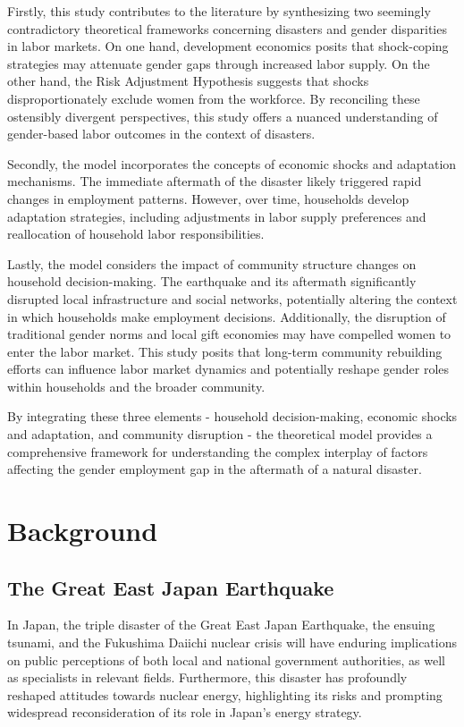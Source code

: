 \documentclass[12pt,halfline,a4paper]{ouparticle}
\begin{document}
Firstly, this study contributes to the literature by synthesizing two seemingly contradictory theoretical frameworks concerning disasters and gender disparities in labor markets. On one hand, development economics posits that shock-coping strategies may attenuate gender gaps through increased labor supply. On the other hand, the Risk Adjustment Hypothesis suggests that shocks disproportionately exclude women from the workforce. By reconciling these ostensibly divergent perspectives, this study offers a nuanced understanding of gender-based labor outcomes in the context of disasters.

Secondly, the model incorporates the concepts of economic shocks and adaptation mechanisms. The immediate aftermath of the disaster likely triggered rapid changes in employment patterns. However, over time, households develop adaptation strategies, including adjustments in labor supply preferences and reallocation of household labor responsibilities.

Lastly, the model considers the impact of community structure changes on household decision-making. The earthquake and its aftermath significantly disrupted local infrastructure and social networks, potentially altering the context in which households make employment decisions. Additionally, the disruption of traditional gender norms and local gift economies may have compelled women to enter the labor market. This study posits that long-term community rebuilding efforts can influence labor market dynamics and potentially reshape gender roles within households and the broader community.

By integrating these three elements - household decision-making, economic shocks and adaptation, and community disruption - the theoretical model provides a comprehensive framework for understanding the complex interplay of factors affecting the gender employment gap in the aftermath of a natural disaster.

\section{Background}
\label{sec2}

\subsection{The Great East Japan Earthquake }
\label{sec5.1}

 In Japan, the triple disaster of the Great East Japan Earthquake, the ensuing tsunami, and the Fukushima Daiichi nuclear crisis will have enduring implications on public perceptions of both local and national government authorities, as well as specialists in relevant fields. Furthermore, this disaster has profoundly reshaped attitudes towards nuclear energy, highlighting its risks and prompting widespread reconsideration of its role in Japan's energy strategy.
\end{document}
